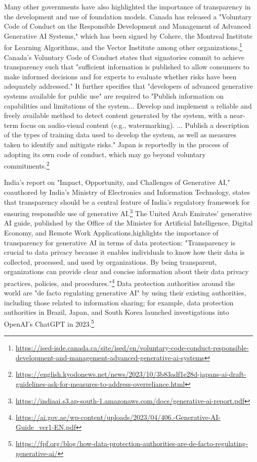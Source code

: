 Many other governments have also highlighted the importance of transparency in the development and use of foundation models. 
Canada has released a "Voluntary Code of Conduct on the Responsible Development and Management of Advanced Generative AI Systems," which has been signed by Cohere, the Montreal Institute for Learning Algorithms, and the Vector Institute among other organizations.\footnote{\url{https://ised-isde.canada.ca/site/ised/en/voluntary-code-conduct-responsible-development-and-management-advanced-generative-ai-systems}} 
Canada's Voluntary Code of Conduct states that signatories commit to achieve transparency such that "sufficient information is published to allow consumers to make informed decisions and for experts to evaluate whether risks have been adequately addressed."
It further specifies that "developers of advanced generative systems available for public use" are required to "Publish information on capabilities and limitations of the system... Develop and implement a reliable and freely available method to detect content generated by the system, with a near-term focus on audio-visual content (e.g., watermarking). ... Publish a description of the types of training data used to develop the system, as well as measures taken to identify and mitigate risks." Japan is reportedly in the process of adopting its own code of conduct, which may go beyond voluntary commitments.\footnote{\url{https://english.kyodonews.net/news/2023/10/3b83adf1e28d-japans-ai-draft-guidelines-ask-for-measures-to-address-overreliance.html}}

India's report on "Impact, Opportunity, and Challenges of Generative AI," coauthored by India's Ministry of Electronics and Information Technology, states that transparency should be a central feature of India's regulatory framework for ensuring responsible use of generative AI.\footnote{\url{https://indiaai.s3.ap-south-1.amazonaws.com/docs/generative-ai-report.pdf}} The United Arab Emirates' generative AI guide, published by the Office of the Minister for Artificial Intelligence, Digital Economy, and Remote Work Applications,highlights the importance of transparency for generative AI in terms of data protection: "Transparency is crucial to data privacy because it enables individuals to know how their data is collected, processed, and used by organizations. By being transparent, organizations can provide clear and concise information about their data privacy practices, policies, and procedures."\footnote{\url{https://ai.gov.ae/wp-content/uploads/2023/04/406.-Generative-AI-Guide_ver1-EN.pdf}} Data protection authorities around the world are "de facto regulating generative AI" by using their existing authorities, including those related to information sharing; for example, data protection authorities in Brazil, Japan, and South Korea launched investigations into OpenAI's ChatGPT in 2023.\footnote{\url{https://fpf.org/blog/how-data-protection-authorities-are-de-facto-regulating-generative-ai/}}

